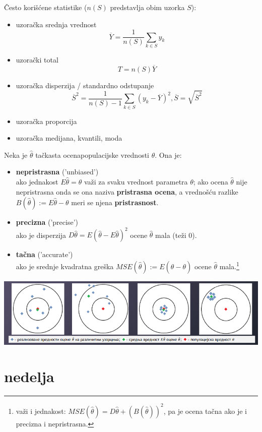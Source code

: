 \documentclass[10pt,a4paper,]{article}
\begin{document}
Često korišćene statistike ($n(S)$ predstavlja obim uzorka $S$):
\begin{itemize}
\item uzoračka srednja vrednost
	$$ \overline{Y} = \frac{1}{n(S)} \sum_{k \in S}y_k$$
\item uzorački total
	$$ T = n(S)\overline{Y}$$
\item uzoračka disperzija / standardno odstupanje 
	$$ \overline{S}^2 = \frac{1}{n(S) - 1}\sum_{k \in S}(y_k - \overline{Y})^2, \overline{S} = \sqrt{\overline{S}^2}$$
\item uzoračka proporcija 
\item uzoračka medijana, kvantili, moda
\end{itemize}
Neka je $\hat{\theta}$ tačkasta ocenapopulacijske vrednosti
$\theta$. Ona je:
\begin{itemize}
\item \textbf{nepristrasna} ('unbiased')
\\
ako jednakost \textbf{$E\hat{\theta} = \theta$} važi za svaku 
vrednost 
parametra $\theta$; ako ocena $\hat{\theta}$ nije nepristrasna onda 
se ona naziva \textbf{pristrasna ocena}, a vrednošću razlike  
$B(\hat{\theta}) := E\hat{\theta} - \theta$ meri se njena 
\textbf{pristrasnost}.
\item \textbf{precizna} ('precise')
\\
ako je disperzija $D\hat{\theta} = E(\hat{\theta} - E\hat{\theta})^2$
ocene $\hat{\theta}$ mala (teži 0).

\item \textbf{tačna} ('accurate')
\\
ako je srednje kvadratna greška 
$MSE(\hat{\theta}) := E(\hat{\theta}-\theta)$ ocene $\hat{\theta}$ 
mala.\footnote{važi i jednakost: 
$MSE(\hat{\theta}) = D\hat{\theta} + (B(\hat{\theta}))^2$, pa je 
ocena tačna ako je i precizna i nepristrasna.}

\end{itemize}
\includegraphics[scale=0.5]{primer7}


\section{nedelja}
\end{document}
